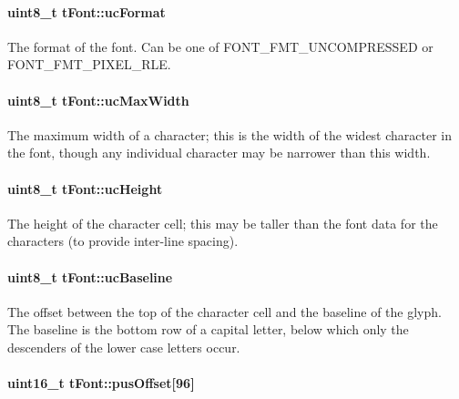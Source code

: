 \paragraph[{uc\+Format}]{\setlength{\rightskip}{0pt plus 5cm}uint8\+\_\+t t\+Font\+::uc\+Format}\label{structt_font_ab3d9bf0e614df9f6cc7661e81ddb13bd}
The format of the font. Can be one of F\+O\+N\+T\+\_\+\+F\+M\+T\+\_\+\+U\+N\+C\+O\+M\+P\+R\+E\+S\+S\+E\+D or F\+O\+N\+T\+\_\+\+F\+M\+T\+\_\+\+P\+I\+X\+E\+L\+\_\+\+R\+L\+E. 
\paragraph[{uc\+Max\+Width}]{\setlength{\rightskip}{0pt plus 5cm}uint8\+\_\+t t\+Font\+::uc\+Max\+Width}\label{structt_font_adc3224837f7d59be6fdefe7fd897c8d2}
The maximum width of a character; this is the width of the widest character in the font, though any individual character may be narrower than this width. 
\paragraph[{uc\+Height}]{\setlength{\rightskip}{0pt plus 5cm}uint8\+\_\+t t\+Font\+::uc\+Height}\label{structt_font_a50434353412200d8aff88751c9297a37}
The height of the character cell; this may be taller than the font data for the characters (to provide inter-\/line spacing). 
\paragraph[{uc\+Baseline}]{\setlength{\rightskip}{0pt plus 5cm}uint8\+\_\+t t\+Font\+::uc\+Baseline}\label{structt_font_a0602c7d3f8ffe42a5267d4d4ad004690}
The offset between the top of the character cell and the baseline of the glyph. The baseline is the bottom row of a capital letter, below which only the descenders of the lower case letters occur. 
\paragraph[{pus\+Offset}]{\setlength{\rightskip}{0pt plus 5cm}uint16\+\_\+t t\+Font\+::pus\+Offset\mbox{[}96\mbox{]}}\label{structt_font_ad6e46d3ebb0f14342270c9b68a78b39f}



